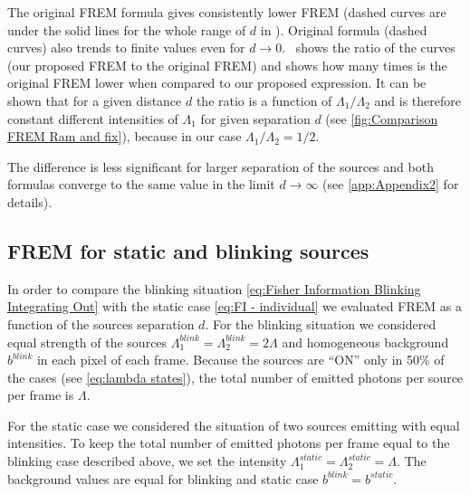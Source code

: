 The original FREM formula gives consistently lower FREM (dashed curves are under the solid lines for the whole range of $d$ in \aaa). Original formula (dashed curves) also trends to finite values even for $d\rightarrow 0$. \bbb\ shows the ratio of the curves (our proposed FREM to the original FREM) and shows how many times is the original FREM lower when compared to our proposed expression. It can be shown that for a given distance $d$ the ratio is a function of $\Lambda_1/\Lambda_2$ and is therefore constant different intensities of $\Lambda_1$ for given separation $d$ (see \autoref{fig:Comparison FREM Ram and fix}\bbb), because in our case $\Lambda_1/\Lambda_2=1/2$.

The difference is less significant for larger separation of the sources and both formulas converge to the same value in the limit $d\rightarrow \infty$ (see \autoref{app:Appendix2} for details).

\subsection{FREM for static and blinking sources\label{sub:FREM static vs blinking}}
%
In order to compare the blinking situation \autoref{eq:Fisher Information Blinking Integrating Out} with the static case \autoref{eq:FI - individual} we evaluated FREM as a function of the sources separation $d$. For the blinking situation we considered equal strength of the sources $\Lambda_1^{blink}=\Lambda_2^{blink}=2\Lambda$ and homogeneous background $b^{blink}$ in each pixel of each frame. Because the sources are ``ON'' only in 50\% of the cases (see \autoref{eq:lambda states}), the total number of emitted photons per source per frame is $\Lambda$. 

For the static case we considered the situation of two sources emitting with equal intensities. To keep the total number of emitted photons per frame equal to the blinking case described above, we set the intensity $\Lambda_1^{static}=\Lambda_2^{static}=\Lambda$. The background values are equal for blinking and static case $b^{blink}=b^{static}$.

